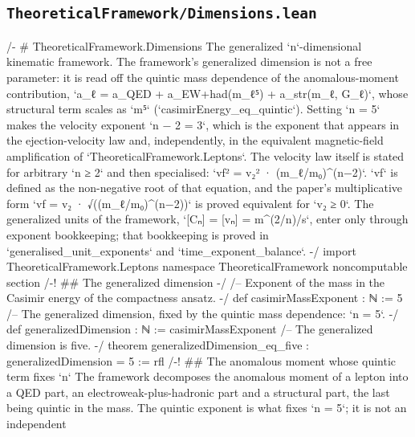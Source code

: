 \documentclass[11pt,a4paper]{article}
\begin{document}
\subsection*{\texttt{TheoreticalFramework/Dimensions.lean}}
\vspace{2pt}
{\ttfamily\scriptsize\setlength{\parindent}{0pt}\setlength{\baselineskip}{7.6pt}\setlength{\parskip}{0pt}\raggedright\obeyspaces\obeylines
/-
\# TheoreticalFramework.Dimensions
\mbox{}
The generalized `n`-dimensional kinematic framework.
\mbox{}
The framework's generalized dimension is not a free parameter: it is read off the
quintic mass dependence of the anomalous-moment contribution,
\mbox{}
  `a\_\allowbreak{}ℓ = a\_\allowbreak{}QED + a\_\allowbreak{}EW+had(m\_\allowbreak{}ℓ⁵) + a\_\allowbreak{}str(m\_\allowbreak{}ℓ, G\_\allowbreak{}ℓ)`,
\mbox{}
whose structural term scales as `m⁵` (`casimirEnergy\_\allowbreak{}eq\_\allowbreak{}quintic`).  Setting
`n = 5` makes the velocity exponent `n − 2 = 3`, which is the exponent that
appears in the ejection-velocity law and, independently, in the equivalent
magnetic-field amplification of `TheoreticalFramework.Leptons`.
\mbox{}
The velocity law itself is stated for arbitrary `n ≥ 2` and then specialised:
\mbox{}
  `vf² = v₂² · (m\_\allowbreak{}ℓ/m₀)\textasciicircum{}(n−2)`.
\mbox{}
`vf` is defined as the non-negative root of that equation, and the paper's
multiplicative form `vf = v₂ · √((m\_\allowbreak{}ℓ/m₀)\textasciicircum{}(n−2))` is proved equivalent for
`v₂ ≥ 0`.
\mbox{}
The generalized units of the framework, `[Cₙ] = [vₙ] = m\textasciicircum{}(2/n)/s`, enter only
through exponent bookkeeping; that bookkeeping is proved in
`generalised\_\allowbreak{}unit\_\allowbreak{}exponents` and `time\_\allowbreak{}exponent\_\allowbreak{}balance`.
-/
import TheoreticalFramework.Leptons
\mbox{}
namespace TheoreticalFramework
\mbox{}
noncomputable section
\mbox{}
/-! \#\# The generalized dimension -/
\mbox{}
/-- Exponent of the mass in the Casimir energy of the compactness ansatz. -/
def casimirMassExponent : ℕ := 5
\mbox{}
/-- The generalized dimension, fixed by the quintic mass dependence: `n = 5`. -/
def generalizedDimension : ℕ := casimirMassExponent
\mbox{}
/-- The generalized dimension is five. -/
theorem generalizedDimension\_\allowbreak{}eq\_\allowbreak{}five : generalizedDimension = 5 := rfl
\mbox{}
/-! \#\# The anomalous moment whose quintic term fixes `n`
\mbox{}
The framework decomposes the anomalous moment of a lepton into a QED part, an
electroweak-plus-hadronic part and a structural part, the last being quintic in
the mass.  The quintic exponent is what fixes `n = 5`; it is not an independent
}
\end{document}
